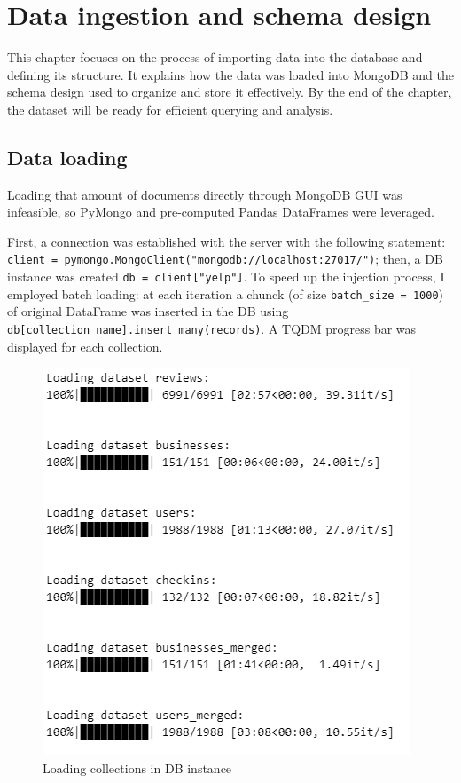 \documentclass{Configuration_Files/PoliMi3i_thesis}
\begin{document}
\bigskip

\cleardoublepage

\chapter{Data ingestion and schema design}
This chapter focuses on the process of importing data into the database and defining its structure. It explains how the data was loaded into MongoDB and the schema design used to organize and store it effectively. By the end of the chapter, the dataset will be ready for efficient querying and analysis.

\section{Data loading}
Loading that amount of documents directly through MongoDB GUI was infeasible, so PyMongo and pre-computed Pandas DataFrames were leveraged. 

First, a connection was established with the server with the following statement: \\
\verb|client = pymongo.MongoClient("mongodb://localhost:27017/")|; then, a DB instance was created \verb|db = client["yelp"]|. 
To speed up the injection process, I employed batch loading: at each iteration a chunck (of size \texttt{batch\_size = 1000}) of original DataFrame was inserted in the DB using \texttt{db[collection\_name].insert\_many(records)}. A TQDM progress bar was displayed for each collection.

\bigskip

\begin{figure}[H]
    \centering
    \includegraphics[width=1\columnwidth / 2]{imgs/injection_process.png}
    \caption{Loading collections in DB instance}
    \label{fig:injection_process}
\end{figure}
\end{document}
